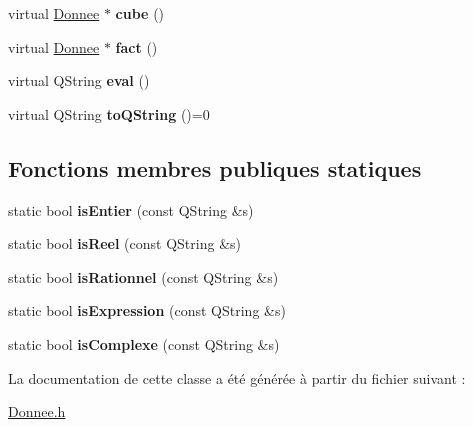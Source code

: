 \begin{DoxyCompactItemize}
\item 
\hypertarget{class_donnee_a40a46fbde2cfe5df2a92661e94bf8b3b}{virtual \hyperlink{class_donnee}{Donnee} $\ast$ {\bfseries cube} ()}\label{class_donnee_a40a46fbde2cfe5df2a92661e94bf8b3b}

\item 
\hypertarget{class_donnee_ac12cf380eacf2a022ec966f879172ebd}{virtual \hyperlink{class_donnee}{Donnee} $\ast$ {\bfseries fact} ()}\label{class_donnee_ac12cf380eacf2a022ec966f879172ebd}

\item 
\hypertarget{class_donnee_a0c5db4e00d821a7ec411e98a9d15730b}{virtual Q\-String {\bfseries eval} ()}\label{class_donnee_a0c5db4e00d821a7ec411e98a9d15730b}

\item 
\hypertarget{class_donnee_a92bcbd4d69bdbc30cc3379c4ffbcb760}{virtual Q\-String {\bfseries to\-Q\-String} ()=0}\label{class_donnee_a92bcbd4d69bdbc30cc3379c4ffbcb760}

\end{DoxyCompactItemize}
\subsection*{Fonctions membres publiques statiques}
\begin{DoxyCompactItemize}
\item 
\hypertarget{class_donnee_ab195ba9c738ca7a68e46619c05efc25d}{static bool {\bfseries is\-Entier} (const Q\-String \&s)}\label{class_donnee_ab195ba9c738ca7a68e46619c05efc25d}

\item 
\hypertarget{class_donnee_a3bf8894c20219f055032e5811606e248}{static bool {\bfseries is\-Reel} (const Q\-String \&s)}\label{class_donnee_a3bf8894c20219f055032e5811606e248}

\item 
\hypertarget{class_donnee_af485090a75b51f1784d60e55a1eefd1a}{static bool {\bfseries is\-Rationnel} (const Q\-String \&s)}\label{class_donnee_af485090a75b51f1784d60e55a1eefd1a}

\item 
\hypertarget{class_donnee_a44a63601c9d70c1a99d9c784df740fbb}{static bool {\bfseries is\-Expression} (const Q\-String \&s)}\label{class_donnee_a44a63601c9d70c1a99d9c784df740fbb}

\item 
\hypertarget{class_donnee_aef26bb261eb570e0ba2094f24ceb5eee}{static bool {\bfseries is\-Complexe} (const Q\-String \&s)}\label{class_donnee_aef26bb261eb570e0ba2094f24ceb5eee}

\end{DoxyCompactItemize}


La documentation de cette classe a été générée à partir du fichier suivant \-:\begin{DoxyCompactItemize}
\item 
\hyperlink{_donnee_8h}{Donnee.\-h}\end{DoxyCompactItemize}
